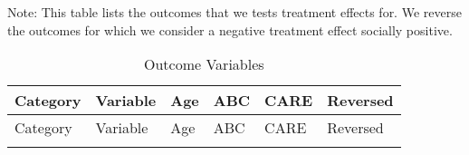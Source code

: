 \begin{center}
\begin{ThreePartTable}

\begin{TableNotes}
Note: This table lists the outcomes that we tests treatment effects for. We reverse the outcomes for which we consider a negative treatment effect socially positive.
\end{TableNotes}


\begin{longtable}{L{4cm} L{5cm} C{1cm} C{1cm} C{1.2cm} C{1.5cm}}

\caption{Outcome Variables} \\

\toprule
Category	&	Variable	&	Age	&	ABC	&	CARE	&	Reversed	\\ \midrule
\endfirsthead

\toprule
Category	&	Variable	&	Age	&	ABC	&	CARE	&	Reversed	\\ \midrule
\endhead

\midrule
\endfoot

\endlastfoot


\end{longtable}
\end{ThreePartTable}
\end{center}
